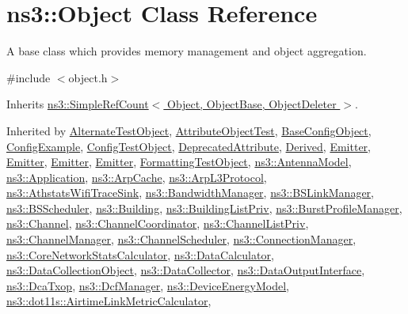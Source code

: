 \hypertarget{classns3_1_1Object}{}\section{ns3\+:\+:Object Class Reference}
\label{classns3_1_1Object}


A base class which provides memory management and object aggregation.  




{\ttfamily \#include $<$object.\+h$>$}



Inherits \hyperlink{classns3_1_1SimpleRefCount}{ns3\+::\+Simple\+Ref\+Count$<$ Object, Object\+Base, Object\+Deleter $>$}.



Inherited by \hyperlink{classAlternateTestObject}{Alternate\+Test\+Object}, \hyperlink{classAttributeObjectTest}{Attribute\+Object\+Test}, \hyperlink{classBaseConfigObject}{Base\+Config\+Object}, \hyperlink{classConfigExample}{Config\+Example}, \hyperlink{classConfigTestObject}{Config\+Test\+Object}, \hyperlink{classDeprecatedAttribute}{Deprecated\+Attribute}, \hyperlink{classDerived}{Derived}, \hyperlink{classEmitter}{Emitter}, \hyperlink{classEmitter}{Emitter}, \hyperlink{classEmitter}{Emitter}, \hyperlink{classEmitter}{Emitter}, \hyperlink{classFormattingTestObject}{Formatting\+Test\+Object}, \hyperlink{classns3_1_1AntennaModel}{ns3\+::\+Antenna\+Model}, \hyperlink{classns3_1_1Application}{ns3\+::\+Application}, \hyperlink{classns3_1_1ArpCache}{ns3\+::\+Arp\+Cache}, \hyperlink{classns3_1_1ArpL3Protocol}{ns3\+::\+Arp\+L3\+Protocol}, \hyperlink{classns3_1_1AthstatsWifiTraceSink}{ns3\+::\+Athstats\+Wifi\+Trace\+Sink}, \hyperlink{classns3_1_1BandwidthManager}{ns3\+::\+Bandwidth\+Manager}, \hyperlink{classns3_1_1BSLinkManager}{ns3\+::\+B\+S\+Link\+Manager}, \hyperlink{classns3_1_1BSScheduler}{ns3\+::\+B\+S\+Scheduler}, \hyperlink{classns3_1_1Building}{ns3\+::\+Building}, \hyperlink{classns3_1_1BuildingListPriv}{ns3\+::\+Building\+List\+Priv}, \hyperlink{classns3_1_1BurstProfileManager}{ns3\+::\+Burst\+Profile\+Manager}, \hyperlink{classns3_1_1Channel}{ns3\+::\+Channel}, \hyperlink{classns3_1_1ChannelCoordinator}{ns3\+::\+Channel\+Coordinator}, \hyperlink{classns3_1_1ChannelListPriv}{ns3\+::\+Channel\+List\+Priv}, \hyperlink{classns3_1_1ChannelManager}{ns3\+::\+Channel\+Manager}, \hyperlink{classns3_1_1ChannelScheduler}{ns3\+::\+Channel\+Scheduler}, \hyperlink{classns3_1_1ConnectionManager}{ns3\+::\+Connection\+Manager}, \hyperlink{classns3_1_1CoreNetworkStatsCalculator}{ns3\+::\+Core\+Network\+Stats\+Calculator}, \hyperlink{classns3_1_1DataCalculator}{ns3\+::\+Data\+Calculator}, \hyperlink{classns3_1_1DataCollectionObject}{ns3\+::\+Data\+Collection\+Object}, \hyperlink{classns3_1_1DataCollector}{ns3\+::\+Data\+Collector}, \hyperlink{classns3_1_1DataOutputInterface}{ns3\+::\+Data\+Output\+Interface}, \hyperlink{classns3_1_1DcaTxop}{ns3\+::\+Dca\+Txop}, \hyperlink{classns3_1_1DcfManager}{ns3\+::\+Dcf\+Manager}, \hyperlink{classns3_1_1DeviceEnergyModel}{ns3\+::\+Device\+Energy\+Model}, \hyperlink{classns3_1_1dot11s_1_1AirtimeLinkMetricCalculator}{ns3\+::dot11s\+::\+Airtime\+Link\+Metric\+Calculator}, 